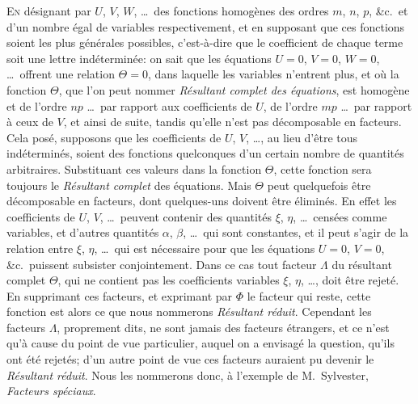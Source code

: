 \documentclass[11pt,a4paper]{book}
\begin{document}
\textsc{En} d\'esignant par $U$, $V$, $W$, \ldots\ des fonctions homog\`enes des ordres $m$, $n$, $p$, \&c.\ et d'un nombre \'egal de variables respectivement, et en supposant que ces fonctions soient les plus g\'en\'erales possibles, c'est-\`a-dire que le coefficient de chaque terme soit une lettre ind\'etermin\'ee: on sait que les \'equations $U = 0$, $V = 0$, $W = 0$, \ldots\ offrent une relation $\Theta = 0$, dans laquelle les variables n'entrent plus, et o\`u la fonction $\Theta$, que l'on peut nommer \textit{R\'esultant complet des \'equations}, est homog\`ene et de l'ordre $np$ \ldots\ par rapport aux coefficients de $U$, de l'ordre $mp$ \ldots\ par rapport \`a ceux de $V$, et ainsi de suite, tandis qu'elle n'est pas d\'ecomposable en facteurs. Cela pos\'e, supposons que les coefficients de $U$, $V$, \ldots, au lieu d'\^etre tous ind\'etermin\'es, soient des fonctions quelconques d'un certain nombre de quantit\'es arbitraires. Substituant ces valeurs dans la fonction $\Theta$, cette fonction sera toujours le \textit{R\'esultant complet} des \'equations. Mais $\Theta$ peut quelquefois \^etre d\'ecomposable en facteurs, dont quelques-uns doivent \^etre \'elimin\'es. En effet les coefficients de $U$, $V$, \ldots\ peuvent contenir des quantit\'es $\xi$, $\eta$, \ldots\ cens\'ees comme variables, et d'autres quantit\'es $\alpha$, $\beta$, \ldots\ qui sont constantes, et il peut s'agir de la relation entre $\xi$, $\eta$, \ldots\ qui est n\'ecessaire pour que les \'equations $U = 0$, $V = 0$, \&c.\ puissent subsister conjointement. Dans ce cas tout facteur $\Lambda$ du r\'esultant complet $\Theta$, qui ne contient pas les coefficients variables $\xi$, $\eta$, \ldots, doit \^etre rejet\'e. En supprimant ces facteurs, et exprimant par $\Phi$ le facteur qui reste, cette fonction est alors ce que nous nommerons \textit{R\'esultant r\'eduit}. Cependant les facteurs $\Lambda$, proprement dits, ne sont jamais des facteurs \'etrangers, et ce n'est qu'\`a cause du point de vue particulier, auquel on a envisag\'e la question, qu'ils ont \'et\'e rejet\'es; d'un autre point de vue ces facteurs auraient pu devenir le \textit{R\'esultant r\'eduit}. Nous les nommerons donc, \`a l'exemple de M.~Sylvester, \textit{Facteurs sp\'eciaux}.
\end{document}
